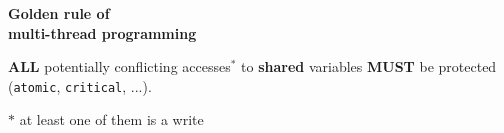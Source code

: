\documentclass{beamer}
\begin{document}

\begin{frame}[label=golden_rule]

  \begin{center}
    \Huge \bf \alert{Golden rule of \\ multi-thread programming }
  \end{center}

  \bigskip
  
  {\Large \textbf{ALL} potentially conflicting accesses${}^*$
    to \textbf{shared} variables \alert{\textbf{MUST}} be protected (\texttt{atomic},
    \texttt{critical}, ...).}

  \bigskip

  $*$ at least one of them is a write
\end{frame}









    






  
\end{document}
